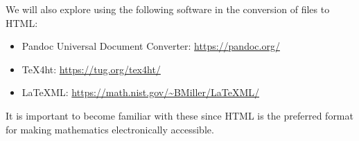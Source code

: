 We will also explore using the following software in the conversion of files to HTML:
\begin{itemize}
    \item Pandoc Universal Document Converter: \url{https://pandoc.org/}
    \item \TeX 4ht: \url{https://tug.org/tex4ht/}
    \item \LaTeX ML: \url{https://math.nist.gov/~BMiller/LaTeXML/}
\end{itemize}
It is important to become familiar with these since HTML is the preferred format for making mathematics electronically accessible.